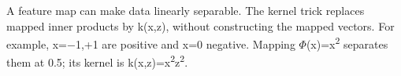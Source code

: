 A feature map can make data linearly separable. The kernel trick replaces mapped inner products by k(x,z), without constructing the mapped vectors. For example, x=\ensuremath{-}1,+1 are positive and x=0 negative. Mapping \ensuremath{\Phi}(x)=x\textsuperscript{2} separates them at 0.5; its kernel is k(x,z)=x\textsuperscript{2}z\textsuperscript{2}.
